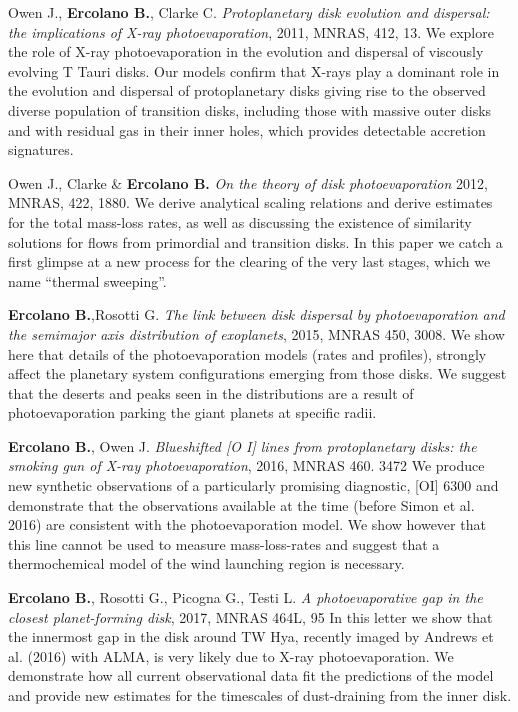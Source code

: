 \documentclass[10pt,fleqn,twoside]{article}
\begin{document}
\begin{literature}
\item Owen J., \textbf{Ercolano B.}, Clarke C.  \textit{
  Protoplanetary disk evolution and dispersal: the implications of X-ray photoevaporation}, 2011, MNRAS, 412, 13.
  We explore the role of X-ray photoevaporation in the evolution and
  dispersal of viscously evolving T Tauri disks. Our models confirm
  that X-rays play a dominant role in the evolution and dispersal of
  protoplanetary disks giving rise to the observed diverse population
  of transition disks, including those with massive outer
  disks and with residual gas in their inner holes, which provides detectable accretion
  signatures.  

\item Owen J., Clarke \& \textbf{Ercolano B.}  \textit{On the theory of disk photoevaporation}
  2012, MNRAS, 422, 1880. We derive analytical scaling relations and
  derive estimates for the total mass-loss rates, as well as
  discussing the existence of similarity solutions for flows from
  primordial and transition disks. In this paper we catch a first
  glimpse at a new process for the clearing of the very last stages,
  which we name ``thermal sweeping''.

\item \textbf{Ercolano B.},Rosotti G. {\em The link between disk
    dispersal by photoevaporation and the semimajor axis distribution
    of exoplanets}, 2015, MNRAS 450,
  3008. We show here that details of the photoevaporation models
  (rates and profiles), strongly affect the planetary system
  configurations emerging from those disks. We suggest that the
  deserts and peaks seen in the distributions are a result of
  photoevaporation parking the giant planets at specific radii.

\item \textbf{Ercolano B.}, Owen J.  {\em Blueshifted [O I] lines from
    protoplanetary disks: the smoking gun of X-ray photoevaporation},
  2016, MNRAS 460. 3472
  We produce new synthetic observations of a particularly promising
  diagnostic, [OI] 6300 and demonstrate that the observations available at the
  time (before Simon et al. 2016) are consistent with the
  photoevaporation model. We show however that this line cannot be
  used to measure mass-loss-rates and suggest that a thermochemical
  model of the wind launching region is necessary. 

\item \textbf{Ercolano B.}, Rosotti G., Picogna G., Testi L.  {\em A photoevaporative gap in the closest planet-forming disk},
  2017, MNRAS 464L, 95
 In this letter we show that the innermost gap in the disk around TW
 Hya, recently imaged by Andrews et al. (2016) with ALMA, is very
 likely due to X-ray photoevaporation. We demonstrate how all current
 observational data fit the predictions of the model and provide new
 estimates for the timescales of dust-draining from the inner disk.


\end{literature}
\end{document}
